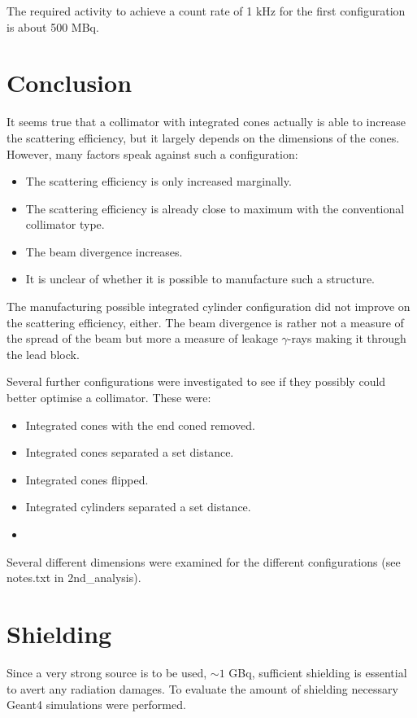 \documentclass[a4paper]{article}
\begin{document}
The required activity to achieve a count rate of 1 kHz for the first configuration is about 500 MBq.


\section{Conclusion}
It seems true that a collimator with integrated cones actually is able to increase the scattering efficiency, but it largely depends on the dimensions of the cones. However, many factors speak against such a configuration:
\begin{itemize}
  \item The scattering efficiency is only increased marginally.
  \item The scattering efficiency is already close to maximum with the conventional collimator type.
  \item The beam divergence increases.
  \item It is unclear of whether it is possible to manufacture such a structure.
\end{itemize}
The manufacturing possible integrated cylinder configuration did not improve on the scattering efficiency, either.
The beam divergence is rather not a measure of the spread of the beam but more a measure of leakage $\gamma$-rays making it through the lead block.

Several further configurations were investigated to see if they possibly could better optimise a collimator. These were:
\begin{itemize}
  \item Integrated cones with the end coned removed.
  \item Integrated cones separated a set distance.
  \item Integrated cones flipped.
  \item Integrated cylinders separated a set distance.
  \item
\end{itemize}
Several different dimensions were examined for the different configurations (see notes.txt in 2nd\_analysis).







\section{Shielding}
Since a very strong source is to be used,  $\sim 1$ GBq, sufficient shielding is essential to avert any radiation damages. To evaluate the amount of shielding necessary Geant4 simulations were performed.
\end{document}
